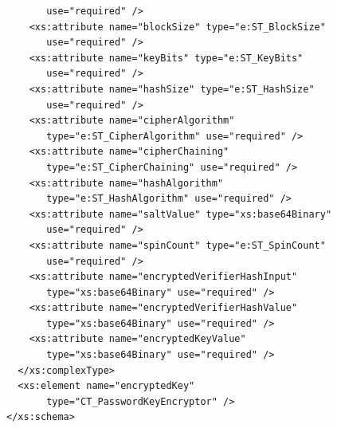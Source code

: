 \documentclass[11pt,oneside]{fithesis2}
\begin{document}
\begin{appendix}
\begin{lstlisting}
       use="required" />
    <xs:attribute name="blockSize" type="e:ST_BlockSize" 
       use="required" /> 
    <xs:attribute name="keyBits" type="e:ST_KeyBits" 
       use="required" />
    <xs:attribute name="hashSize" type="e:ST_HashSize" 
       use="required" /> 
    <xs:attribute name="cipherAlgorithm" 
       type="e:ST_CipherAlgorithm" use="required" /> 
    <xs:attribute name="cipherChaining"
       type="e:ST_CipherChaining" use="required" /> 
    <xs:attribute name="hashAlgorithm" 
       type="e:ST_HashAlgorithm" use="required" /> 
    <xs:attribute name="saltValue" type="xs:base64Binary" 
       use="required" /> 
    <xs:attribute name="spinCount" type="e:ST_SpinCount"
       use="required" />
    <xs:attribute name="encryptedVerifierHashInput"
       type="xs:base64Binary" use="required" /> 
    <xs:attribute name="encryptedVerifierHashValue"
       type="xs:base64Binary" use="required" />
    <xs:attribute name="encryptedKeyValue"
       type="xs:base64Binary" use="required" />
  </xs:complexType> 
  <xs:element name="encryptedKey" 
       type="CT_PasswordKeyEncryptor" />
</xs:schema>
	\end{lstlisting}
\end{appendix}
\end{document}

